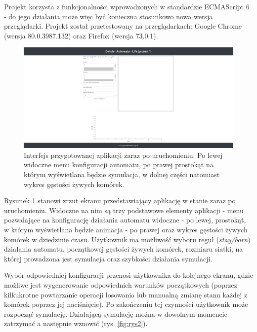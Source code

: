 \documentclass[12pt] {article}
\begin{document}
Projekt korzysta z funkcjonalności wprowadzonych w standardzie ECMAScript 6 - do jego działania może więc być konieczna stosunkowo nowa wersja przeglądarki. Projekt został przetestowany na przeglądarkach: Google Chrome (wersja 80.0.3987.132) oraz Firefox (wersja 73.0.1). 

\begin{figure}[H]
\centering
\includegraphics[width=\textwidth]{res/interface1.png}
\caption{Interfejs przygotowanej aplikacji zaraz po uruchomieniu. Po lewej widoczne menu konfiguracji automatu, po prawej prostokąt na którym wyświetlana będzie symulacja, w dolnej części natomiast wykres gęstości żywych komórek.}
\label{fig:rys1}
\end{figure} 
\newpage

Rysunek \ref{fig:rys1} stanowi zrzut ekranu przedstawiający aplikację w stanie zaraz po uruchomieniu. Widoczne na nim są trzy podstawowe elementy aplikacji - menu pozwalające na konfigurację działania automatu widoczne - po lewej, prostokąt, w którym wyświetlana będzie animacja - po prawej oraz wykres gęstości żywych komórek w dziedzinie czasu. Użytkownik ma możliwość wyboru reguł (\textit{stay/born}) działania automatu, początkowej gęstości żywych komórek, rozmiaru siatki, na której prowadzona jest symulacja oraz szybkości działania symulacji. 


Wybór odpowiedniej konfiguracji przenosi użytkownika do kolejnego ekranu, gdzie możliwe jest wygenerowanie odpowiednich warunków początkowych (poprzez kilkukrotne powtarzanie operacji losowania lub manualną zmianę stanu każdej z komórek poprzez jej naciśnięcie). Po zakończeniu tej czynności użytkownik może rozpocząć symulację. Działającą symulację można w dowolnym momencie zatrzymać a następnie wznowić (rys. \ref{fig:rys2}).
\end{document}
